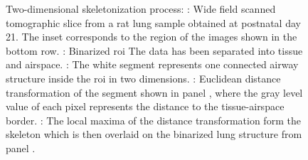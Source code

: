 \begin{figure}
{{			\label{subfig:skel-c}%
			}%
	}%
	\caption[\twod skeletonization]{Two-dimensional skeletonization process: : Wide field scanned tomographic slice from a rat lung sample obtained at postnatal day 21. The inset corresponds to the region of the images shown in the bottom row. : Binarized \ac{roi} The data has been separated into tissue and airspace. : The white segment represents one connected airway structure inside the \ac{roi} in two dimensions. : Euclidean distance transformation of the segment shown in panel , where the gray level value of each pixel represents the distance to the tissue-airspace border. : The local maxima of the distance transformation form the skeleton which is then overlaid on the binarized lung structure from panel .}%
	\label{fig:skeletonization}%
\end{figure}

